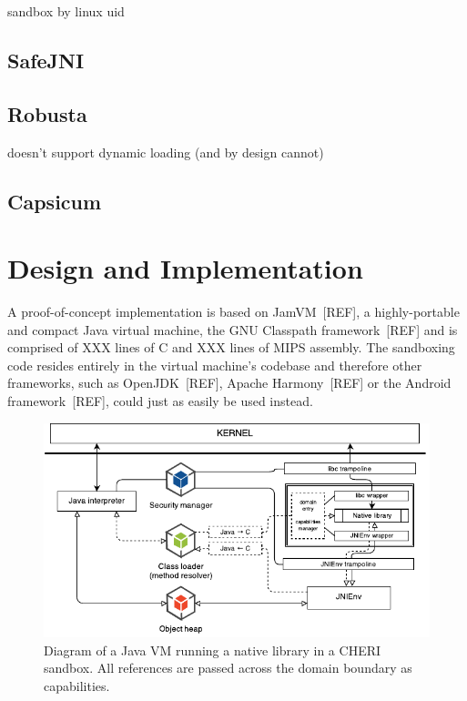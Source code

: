 \documentclass[a4paper,12pt,twoside,openright]{report}
\begin{document}
sandbox by linux uid

\section{SafeJNI}

\section{Robusta}

doesn't support dynamic loading (and by design cannot)

\section{Capsicum}

\chapter{Design and Implementation} 

A proof-of-concept implementation is based on JamVM~[REF], a highly-portable and compact Java virtual machine, the GNU Classpath framework~[REF] and is comprised of XXX lines of C and XXX lines of MIPS assembly. The sandboxing code resides entirely in the virtual machine's codebase and therefore other frameworks, such as OpenJDK~[REF], Apache Harmony~[REF] or the Android framework~[REF], could just as easily be used instead.

\begin{figure}
	\includegraphics[width=\textwidth]{dia_jni_caps.pdf}
	\caption{Diagram of a Java VM running a native library in a CHERI sandbox. All references are passed across the domain boundary as capabilities.}
	\label{fig:OverviewCheriJNI}
\end{figure}
\end{document}
